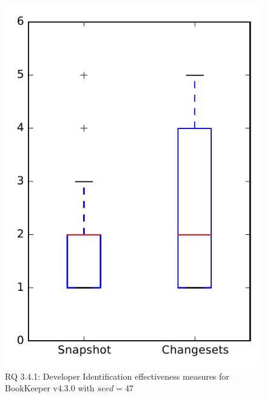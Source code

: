 
\begin{figure}
\centering
\includegraphics[height=0.4\textheight]{figures/dit_seed/rq1_bookkeeper_47}
\caption{RQ 3.4.1: Developer Identification effectiveness measures for BookKeeper v4.3.0 with $seed=47$}
\label{fig:dit_seed:rq1:bookkeeper}
\end{figure}
